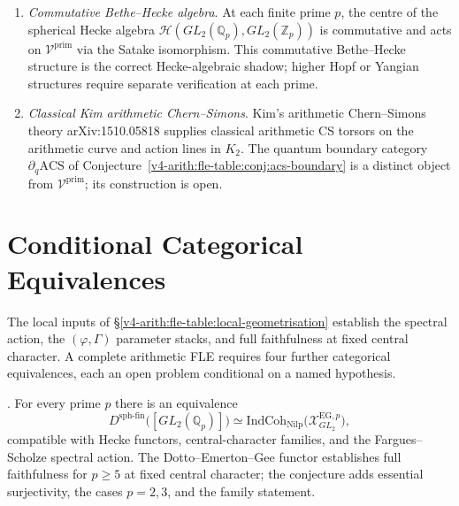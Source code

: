\begin{theorem}
\begin{enumerate}
\item \emph{Commutative Bethe--Hecke algebra}.
  At each finite prime \(p\), the centre of the spherical Hecke algebra
  \(\mathcal{H}(GL_{2}(\mathbb{Q}_{p}),GL_{2}(\mathbb{Z}_{p}))\)
  is commutative and acts on
  \(\mathcal{V}^{\mathrm{prim}}\) via the Satake isomorphism. This
  commutative Bethe--Hecke structure is the correct Hecke-algebraic
  shadow; higher Hopf or Yangian structures require separate
  verification at each prime.

\item \emph{Classical Kim arithmetic Chern--Simons}.
  Kim's arithmetic Chern--Simons theory arXiv:1510.05818 supplies
  classical arithmetic CS torsors on the arithmetic curve and action
  lines in \(K_{2}\). The quantum boundary category
  \(\partial_{q}\mathrm{ACS}\) of Conjecture~\ref{v4-arith:fle-table:conj:acs-boundary}
  is a distinct object from \(\mathcal{V}^{\mathrm{prim}}\);
  its construction is open.
\end{enumerate}
\end{theorem}

\section{Conditional Categorical Equivalences}
\label{v4-arith:fle-table:conditions}

The local inputs of \S\ref{v4-arith:fle-table:local-geometrisation}
establish the spectral action, the \((\varphi,\Gamma)\) parameter stacks,
and full faithfulness at fixed central character. A complete arithmetic FLE
requires four further categorical equivalences, each an open problem
conditional on a named hypothesis.

\begin{conjecture}
\label{v4-arith:fle-table:conj:local-cat}
\ClaimStatusConjectured. For every prime \(p\) there is an equivalence
\begin{equation}
\label{v4-arith:fle-table:eq:local-cat}
D^{\mathrm{sph\text{-}fin}}\bigl([GL_{2}(\mathbb{Q}_{p})]\bigr)
\simeq
\mathrm{IndCoh}_{\mathrm{Nilp}}\bigl(\mathcal{X}^{\mathrm{EG},p}_{GL_{2}}\bigr),
\end{equation}
compatible with Hecke functors, central-character families, and the
Fargues--Scholze spectral action. The Dotto--Emerton--Gee functor
establishes full faithfulness for \(p \geq 5\) at fixed central
character; the conjecture adds essential surjectivity, the cases
\(p = 2, 3\), and the family statement.
\end{conjecture}

